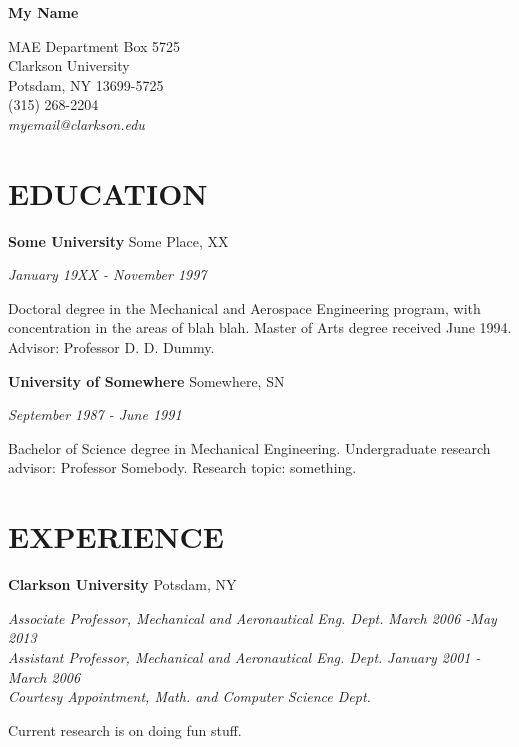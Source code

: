 



\begin{center}
\Large{\bf My Name}      %
\end{center}

\begin{center}
MAE Department Box 5725\\
Clarkson University\\
Potsdam, NY 13699-5725\\
(315) 268-2204\\
\em{myemail@clarkson.edu}
\end{center}

\section*{EDUCATION}
{\bf Some University} \hspace*{\fill}
{ Some Place, XX}
\par
{\em January 19XX - November 1997}
\par
Doctoral degree in the Mechanical and Aerospace Engineering program,
with concentration in the areas of blah blah.  Master of Arts degree received June 1994.  Advisor: Professor D. D. Dummy.
\par
\vspace{\baselineskip}
{\bf University of Somewhere} \hspace*{\fill}
{ Somewhere, SN}
\par
{\em September 1987 - June 1991}
\par
Bachelor of Science degree in Mechanical Engineering.   
Undergraduate research advisor: Professor Somebody.  Research topic: something.

\section*{EXPERIENCE}
{\bf Clarkson University}  \hspace*{\fill} Potsdam, NY
\par
{\em Associate Professor, Mechanical and Aeronautical Eng. Dept.} \hfill {\em March 2006 -May 2013}\\
{\em Assistant Professor, Mechanical and Aeronautical Eng. Dept.} \hfill {\em January 2001 - March 2006 }\\
{\em Courtesy Appointment, Math. and Computer Science Dept.} 

\par
Current research is on doing fun stuff.  

